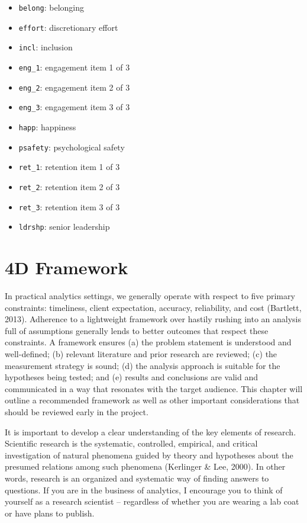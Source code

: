 \documentclass[
]{book}
\providecommand{\tightlist}{%
  \setlength{\itemsep}{0pt}\setlength{\parskip}{0pt}}
\begin{document}
\begin{itemize}
\tightlist
\item
  \texttt{belong}: belonging
\item
  \texttt{effort}: discretionary effort
\item
  \texttt{incl}: inclusion
\item
  \texttt{eng\_1}: engagement item 1 of 3
\item
  \texttt{eng\_2}: engagement item 2 of 3
\item
  \texttt{eng\_3}: engagement item 3 of 3
\item
  \texttt{happ}: happiness
\item
  \texttt{psafety}: psychological safety
\item
  \texttt{ret\_1}: retention item 1 of 3
\item
  \texttt{ret\_2}: retention item 2 of 3
\item
  \texttt{ret\_3}: retention item 3 of 3
\item
  \texttt{ldrshp}: senior leadership
\end{itemize}

\hypertarget{d-framework}{%
\section{4D Framework}\label{d-framework}}

In practical analytics settings, we generally operate with respect to five primary constraints: timeliness, client expectation, accuracy, reliability, and cost (Bartlett, 2013). Adherence to a lightweight framework over hastily rushing into an analysis full of assumptions generally lends to better outcomes that respect these constraints. A framework ensures (a) the problem statement is understood and well-defined; (b) relevant literature and prior research are reviewed; (c) the measurement strategy is sound; (d) the analysis approach is suitable for the hypotheses being tested; and (e) results and conclusions are valid and communicated in a way that resonates with the target audience. This chapter will outline a recommended framework as well as other important considerations that should be reviewed early in the project.

It is important to develop a clear understanding of the key elements of research. Scientific research is the systematic, controlled, empirical, and critical investigation of natural phenomena guided by theory and hypotheses about the presumed relations among such phenomena (Kerlinger \& Lee, 2000). In other words, research is an organized and systematic way of finding answers to questions. If you are in the business of analytics, I encourage you to think of yourself as a research scientist -- regardless of whether you are wearing a lab coat or have plans to publish.
\end{document}

